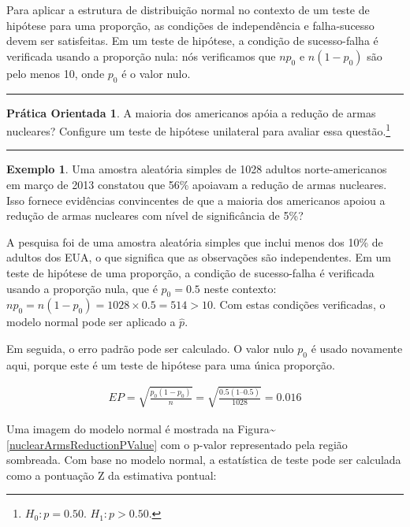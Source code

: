 \documentclass[
]{book}
\theoremstyle{definition}
\theoremstyle{definition}
\newtheorem{example}{Exemplo}[chapter]
\theoremstyle{definition}
\newtheorem{exercise}{Prática Orientada}[chapter]
\theoremstyle{definition}
\theoremstyle{remark}
\begin{document}
Para aplicar a estrutura de distribuição normal no contexto de um teste de hipótese para uma proporção, as condições de independência e falha-sucesso devem ser satisfeitas. Em um teste de hipótese, a condição de sucesso-falha é verificada usando a proporção nula: nós verificamos que \(np_0\) e \(n(1-p_0)\) são pelo menos 10, onde \(p_0\) é o valor nulo.

\begin{center}\rule{0.5\linewidth}{0.5pt}\end{center}

\begin{exercise}
\protect\hypertarget{exr:unnamed-chunk-227}{}{\label{exr:unnamed-chunk-227} }A maioria dos americanos apóia a redução de armas nucleares? Configure um teste de hipótese unilateral para avaliar essa questão.\footnote{\(H_0: p = 0.50\). \(H_1: p > 0.50\).}
\end{exercise}

\begin{center}\rule{0.5\linewidth}{0.5pt}\end{center}

\begin{example}
\protect\hypertarget{exm:NuclearArmsInferenceExample}{}{\label{exm:NuclearArmsInferenceExample} }Uma amostra aleatória simples de 1028 adultos norte-americanos em março de 2013 constatou que 56\% apoiavam a redução de armas nucleares. Isso fornece evidências convincentes de que a maioria dos americanos apoiou a redução de armas nucleares com nível de significância de 5\%?
\end{example}

A pesquisa foi de uma amostra aleatória simples que inclui menos dos 10\% de adultos dos EUA, o que significa que as observações são independentes. Em um teste de hipótese de uma proporção, a condição de sucesso-falha é verificada usando a proporção nula, que é \(p_0 = 0.5\) neste contexto: \(n p_0 = n (1 - p_0) = 1028 \times 0.5 = 514 > 10\). Com estas condições verificadas, o modelo normal pode ser aplicado a \(\hat{p}\).

Em seguida, o erro padrão pode ser calculado. O valor nulo \(p_0\) é usado novamente aqui, porque este é um teste de hipótese para uma única proporção.

\begin{align*}
EP = \sqrt{\frac{p_0 (1 - p_0)}{n}} = \sqrt{\frac{0.5 (1 – 0.5)}{1028}} = 0.016
\end{align*}

Uma imagem do modelo normal é mostrada na Figura\textasciitilde{}\ref{nuclearArmsReductionPValue} com o p-valor representado pela região sombreada. Com base no modelo normal, a estatística de teste pode ser calculada como a pontuação Z da estimativa pontual:
\end{document}
